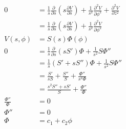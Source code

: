 \documentclass{article}
\begin{document}
\begin{align*}
  0                        & = \frac{1}{s} \frac{\partial}{\partial s} \left( s \frac{\partial V}{\partial s} \right) + \frac{1}{s^2} \frac{\partial^2 V}{\partial \phi^2} + \frac{\partial^2 V}{\partial z^2} \\
                           & = \frac{1}{s} \frac{\partial}{\partial s} \left( s \frac{\partial V}{\partial s} \right) + \frac{1}{s^2} \frac{\partial^2 V}{\partial \phi^2}                                     \\
  V(s, \phi)               & = S(s) \Phi(\phi)                                                                                                                                                                 \\
  0                        & = \frac{1}{s} \frac{\partial}{\partial s} (s S') \Phi + \frac{1}{s^2} S \Phi''                                                                                                    \\
                           & = \frac{1}{s} (S' + s S'') \Phi + \frac{1}{s^2} S \Phi''                                                                                                                          \\
                           & = \frac{S'}{s S} + \frac{S''}{S} + \frac{\Phi''}{s^2 \Phi}                                                                                                                        \\
                           & = \frac{s^2 S'' + s S'}{S} + \frac{\Phi''}{\Phi}                                                                                                                                  \\
  \frac{\Phi''}{\Phi}      & = 0                                                                                                                                                                               \\
  \Phi''                   & = 0                                                                                                                                                                               \\
  \Phi                     & = c_1 + c_2 \phi                                                                                                                                                                  \\

\end{align*}
\end{document}
